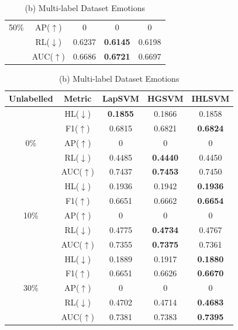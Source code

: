 \documentclass[12pt,a4paper,oneside,english]{report}
\begin{document}
\begin{table}[htbp]
\begin{center}
\begin{minipage}{0.48\linewidth}
\begin{tabular}{|c|c|c|c|c|}
                50\% & AP(\(\uparrow\)) & 0 & 0 & 0 \\
                & RL(\(\downarrow\)) & 0.6237 & \textbf{0.6145} & 0.6198 \\
                & AUC(\(\uparrow\))  & 0.6686 & \textbf{0.6721} & 0.6697 \\
                \hline
            \end{tabular}
        \end{minipage}
        \hfill
        \begin{minipage}{0.48\linewidth}
            \centering
            \caption*{(b) Multi-label Dataset Emotions}
            \begin{tabular}{|c|c|c|c|c|}
                \hline
                \textbf{Unlabelled} & \textbf{Metric} & \textbf{LapSVM} & \textbf{HGSVM} & \textbf{IHLSVM} \\
                \hline
                & HL(\(\downarrow\)) & \textbf{0.1855} & 0.1866 & 0.1858 \\
                & F1(\(\uparrow\))   & 0.6815 & 0.6821 & \textbf{0.6824} \\
                0\% & AP(\(\uparrow\)) & 0 & 0 & 0 \\
                & RL(\(\downarrow\)) & 0.4485 & \textbf{0.4440} & 0.4450 \\
                & AUC(\(\uparrow\))  & 0.7437 & \textbf{0.7453} & 0.7450 \\
                \hline
                & HL(\(\downarrow\)) & 0.1936 & 0.1942 & \textbf{0.1936} \\
                & F1(\(\uparrow\))   & 0.6651 & 0.6662 & \textbf{0.6654} \\
                10\% & AP(\(\uparrow\)) & 0 & 0 & 0 \\
                & RL(\(\downarrow\)) & 0.4775 & \textbf{0.4734} & 0.4767 \\
                & AUC(\(\uparrow\))  & 0.7355 & \textbf{0.7375} & 0.7361 \\
                \hline
                & HL(\(\downarrow\)) & 0.1889 & 0.1917 & \textbf{0.1880} \\
                & F1(\(\uparrow\))   & 0.6651 & 0.6626 & \textbf{0.6670} \\
                30\% & AP(\(\uparrow\)) & 0 & 0 & 0 \\
                & RL(\(\downarrow\)) & 0.4702 & 0.4714 & \textbf{0.4683} \\
                & AUC(\(\uparrow\))  & 0.7381 & 0.7383 & \textbf{0.7395} \\

\end{tabular}
\end{minipage}
\end{center}
\end{table}
\end{document}
